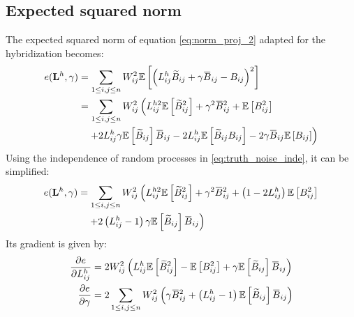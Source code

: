 \documentclass[12pt]{scrartcl}
\newcommand{\overbar}[1]{\mkern 1.5mu\overline{\mkern-1.5mu#1\mkern-1.5mu}\mkern 1.5mu}
\begin{document}
\subsection{Expected squared norm}
The expected squared norm of equation \eqref{eq:norm_proj_2} adapted for the hybridization becomes:
\begin{align}
e(\mathbf{L}^h,\gamma) & = \sum_{1 \le i,j \le n} W_{ij}^2 \mathbb{E}\left[ \left(L^h_{ij} \widetilde{B}_{ij} + \gamma \overbar{B}_{ij} - B_{ij} \right)^2 \right] \nonumber \\
& = \sum_{1 \le i,j \le n} W_{ij}^2 \left(L^{h2}_{ij} \mathbb{E} \left[\widetilde{B}_{ij}^2\right] + \gamma^2 \overbar{B}_{ij}^2 + \mathbb{E} \left[B^2_{ij}\right] \right. \nonumber \\
& \left. \quad + 2 L^h_{ij} \gamma \mathbb{E} \left[\widetilde{B}_{ij}\right] \overbar{B}_{ij} - 2 L^h_{ij} \mathbb{E} \left[\widetilde{B}_{ij} B_{ij}\right] - 2 \gamma \overbar{B}_{ij} \mathbb{E} \left[B_{ij}\right] \right)
\end{align}
Using the independence of random processes in \eqref{eq:truth_noise_inde}, it can be simplified:
\begin{align}
e(\mathbf{L}^h,\gamma) & = \sum_{1 \le i,j \le n} W_{ij}^2 \left(L^{h2}_{ij} \mathbb{E} \left[\widetilde{B}_{ij}^2\right] + \gamma^2 \overbar{B}_{ij}^2 + \left(1 - 2 L^h_{ij}\right) \mathbb{E} \left[B^2_{ij}\right] \right. \nonumber \\
& \left. \quad + 2 \left(L^h_{ij} - 1\right) \gamma \mathbb{E} \left[\widetilde{B}_{ij}\right] \overbar{B}_{ij} \right)
\end{align}
Its gradient is given by:
\begin{subequations}
\begin{align}
\frac{\partial e}{\partial L^h_{ij}} & = 2 W_{ij}^2 \left(L^h_{ij} \mathbb{E} \left[\widetilde{B}_{ij}^2\right] - \mathbb{E} \left[B^2_{ij}\right] + \gamma \mathbb{E} \left[\widetilde{B}_{ij}\right] \overbar{B}_{ij} \right) \\
\frac{\partial e}{\partial \gamma} & = 2 \sum_{1 \le i,j \le n} W_{ij}^2 \left(\gamma \overbar{B}_{ij}^2 + \left(L^h_{ij} - 1\right) \mathbb{E} \left[\widetilde{B}_{ij}\right] \overbar{B}_{ij} \right)
\end{align}
\end{subequations}
\end{document}
